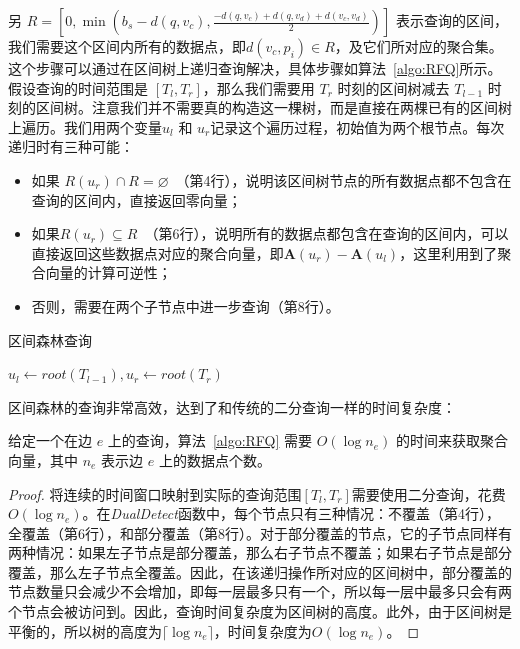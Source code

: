 	另 $R = [0, \min(b_s - d(q, v_c), \frac{-d(q, v_c) + d(q, v_d) + d(v_c, v_d)}{2})]$ 表示查询的区间，我们需要这个区间内所有的数据点，即$d(v_c, p_i) \in R$，及它们所对应的聚合集。这个步骤可以通过在区间树上递归查询解决，具体步骤如算法~\ref{algo:RFQ}所示。假设查询的时间范围是 $[T_l, T_r]$，那么我们需要用 $T_r$ 时刻的区间树减去 $T_{l-1}$ 时刻的区间树。注意我们并不需要真的构造这一棵树，而是直接在两棵已有的区间树上遍历。我们用两个变量$u_l$ 和 $u_r$记录这个遍历过程，初始值为两个根节点。每次递归时有三种可能：
	\begin{itemize}
		\item 如果 $R(u_r) \cap R = \varnothing$~（第4行），说明该区间树节点的所有数据点都不包含在查询的区间内，直接返回零向量；
		\item 如果$R(u_r) \subseteq R$~（第6行），说明所有的数据点都包含在查询的区间内，可以直接返回这些数据点对应的聚合向量，即$\mathbf{A}(u_r) - \mathbf{A}(u_l)$，这里利用到了聚合向量的计算可逆性；
		\item 否则，需要在两个子节点中进一步查询（第8行）。
	\end{itemize}

	\begin{algorithm}[h]
		\caption{区间森林查询}
		\label{algo:RFQ}
		\DontPrintSemicolon

		$u_l \leftarrow root(T_{l-1}), u_r \leftarrow root(T_r)$
		
		
	\end{algorithm}

区间森林的查询非常高效，达到了和传统的二分查询一样的时间复杂度：

\begin{lemma}
	给定一个在边 $e$ 上的查询，算法~\ref{algo:RFQ} 需要 $O(\log{n_e})$ 的时间来获取聚合向量，其中 $n_e$ 表示边 $e$ 上的数据点个数。
\end{lemma}

\begin{proof}
	将连续的时间窗口映射到实际的查询范围$[T_l, T_r]$需要使用二分查询，花费$O(\log{n_e})$。在\textit{DualDetect}函数中，每个节点只有三种情况：不覆盖（第4行），全覆盖（第6行），和部分覆盖（第8行）。对于部分覆盖的节点，它的子节点同样有两种情况：如果左子节点是部分覆盖，那么右子节点不覆盖；如果右子节点是部分覆盖，那么左子节点全覆盖。因此，在该递归操作所对应的区间树中，部分覆盖的节点数量只会减少不会增加，即每一层最多只有一个，所以每一层中最多只会有两个节点会被访问到。因此，查询时间复杂度为区间树的高度。此外，由于区间树是平衡的，所以树的高度为$\lceil\log{n_e}\rceil$，时间复杂度为$O(\log{n_e})$。
\end{proof}

